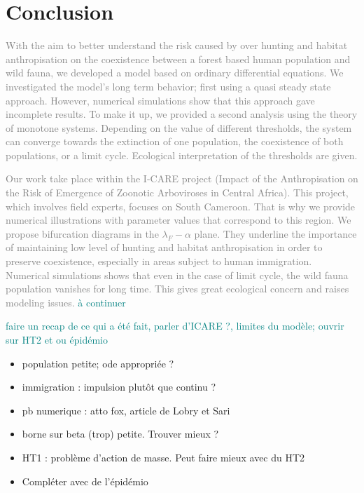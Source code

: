 \documentclass{article}
\newcommand{\lfw}{\lambda_{F}}
\newcommand{\lfw}{\lambda_{F}}
\newcommand{\marc}[1]{\textcolor{teal}{#1}}
\newcommand{\vtrois}[1]{\textcolor{gray}{#1}}
\theoremstyle{definition}
\theoremstyle{remark}
\begin{document}
\section{Conclusion} \label{sec:conclusion}

\vtrois{
With the aim to better understand the risk caused by over hunting and habitat anthropisation on the coexistence between a forest based human population and wild fauna, we developed a model based on ordinary differential equations. We investigated the model's long term behavior;  first using a quasi steady state approach. However, numerical simulations show that this approach gave incomplete results. To make it up, we provided a second analysis using the theory of monotone systems. Depending on the value of different thresholds, the system can converge towards the extinction of one population, the coexistence of both populations, or a limit cycle. Ecological interpretation of the thresholds are given.
}

\vtrois{
Our work take place within the I-CARE project (Impact of the Anthropisation on the Risk of Emergence of Zoonotic Arboviroses in Central Africa). This project, which involves field experts, focuses on South Cameroon. That is why we provide numerical illustrations with parameter values that correspond to this region. We propose bifurcation diagrams in the $\lfw-\alpha$ plane. They underline the importance of maintaining low level of hunting and habitat anthropisation in order to preserve coexistence, especially in areas subject to human immigration. Numerical simulations shows that even in the case of limit cycle, the wild fauna population vanishes for long time. This gives great ecological concern and raises modeling issues.
}
\marc{à continuer}

 

\marc{faire un recap de ce qui a été fait, parler d'ICARE ?, limites du modèle; ouvrir sur HT2 et ou épidémio}

\begin{itemize}
\item population petite; ode appropriée ?
\item immigration : impulsion plutôt que continu ?
\item pb numerique : atto fox, article de Lobry et Sari
\item borne sur beta (trop) petite. Trouver mieux ?
\item HT1 : problème d'action de masse. Peut faire mieux avec du HT2
\item Compléter avec de l'épidémio
\end{itemize}
\end{document}
